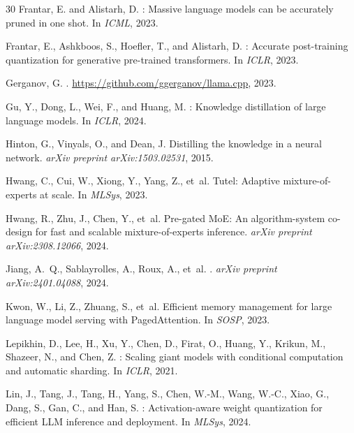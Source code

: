 \documentclass[11pt,a4paper]{article}
\begin{document}
\begin{thebibliography}{30}
Frantar, E. and Alistarh, D.
: Massive language models can be accurately pruned in one
  shot.
\newblock In \emph{ICML}, 2023.

Frantar, E., Ashkboos, S., Hoefler, T., and Alistarh, D.
: Accurate post-training quantization for generative
  pre-trained transformers.
\newblock In \emph{ICLR}, 2023.

Gerganov, G.
.
\newblock \url{https://github.com/ggerganov/llama.cpp}, 2023.

Gu, Y., Dong, L., Wei, F., and Huang, M.
: Knowledge distillation of large language models.
\newblock In \emph{ICLR}, 2024.

Hinton, G., Vinyals, O., and Dean, J.
\newblock Distilling the knowledge in a neural network.
\newblock \emph{arXiv preprint arXiv:1503.02531}, 2015.

Hwang, C., Cui, W., Xiong, Y., Yang, Z., et~al.
\newblock Tutel: Adaptive mixture-of-experts at scale.
\newblock In \emph{MLSys}, 2023.

Hwang, R., Zhu, J., Chen, Y., et~al.
\newblock Pre-gated {MoE}: An algorithm-system co-design for fast and scalable
  mixture-of-experts inference.
\newblock \emph{arXiv preprint arXiv:2308.12066}, 2024.

Jiang, A.~Q., Sablayrolles, A., Roux, A., et~al.
.
\newblock \emph{arXiv preprint arXiv:2401.04088}, 2024.

Kwon, W., Li, Z., Zhuang, S., et~al.
\newblock Efficient memory management for large language model serving with
  {PagedAttention}.
\newblock In \emph{SOSP}, 2023.

Lepikhin, D., Lee, H., Xu, Y., Chen, D., Firat, O., Huang, Y., Krikun, M.,
  Shazeer, N., and Chen, Z.
: Scaling giant models with conditional computation and
  automatic sharding.
\newblock In \emph{ICLR}, 2021.

Lin, J., Tang, J., Tang, H., Yang, S., Chen, W.-M., Wang, W.-C., Xiao, G.,
  Dang, S., Gan, C., and Han, S.
: Activation-aware weight quantization for efficient {LLM}
  inference and deployment.
\newblock In \emph{MLSys}, 2024.


\end{thebibliography}
\end{document}
